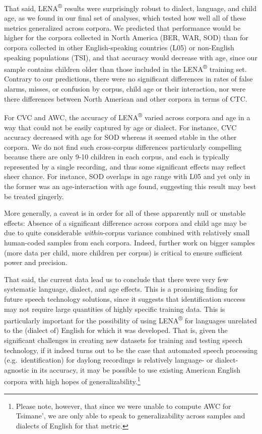 \documentclass[english,table,man,floatsintext]{apa6}
\begin{document}
That said, LENA\textsuperscript{®} results were surprisingly robust to dialect, language, and child age, as we found in our final set of analyses, which tested how well all of these metrics generalized across corpora. We predicted that performance would be higher for the corpora collected in North America (BER, WAR, SOD) than for corpora collected in other English-speaking countries (L05) or non-English speaking populations (TSI), and that accuracy would decrease with age, since our sample contains children older than those included in the LENA\textsuperscript{®} training set. Contrary to our predictions, there were no significant differences in rates of false alarms, misses, or confusion by corpus, child age or their interaction, nor were there differences between North American and other corpora in terms of CTC.

For CVC and AWC, the accuracy of LENA\textsuperscript{®} varied across corpora and age in a way that could not be easily captured by age or dialect. For instance, CVC accuracy decreased with age for SOD whereas it seemed stable in the other corpora. We do not find such cross-corpus differences particularly compelling because there are only 9-10 children in each corpus, and each is typically represented by a single recording, and thus some significant effects may reflect sheer chance. For instance, SOD overlaps in age range with L05 and yet only in the former was an age-interaction with age found, suggesting this result may best be treated gingerly.

More generally, a caveat is in order for all of these apparently null or unstable effects: Absence of a significant difference across corpora and child age may be due to quite considerable \emph{within}-corpus variance combined with relatively small human-coded samples from each corpora. Indeed, further work on bigger samples (more data per child, more children per corpus) is critical to ensure sufficient power and precision.

That said, the current data lead us to conclude that there were very few systematic language, dialect, and age effects. This is a promising finding for future speech technology solutions, since it suggests that identification success may not require large quantities of highly specific training data. This is particularly important for the possibility of using LENA\textsuperscript{®} for languages unrelated to the (dialect of) English for which it was developed. That is, given the significant challenges in creating new datasets for training and testing speech technology, if it indeed turns out to be the case that automated speech processing (e.g.~identification) for daylong recordings is relatively language- or dialect-agnostic in its accuracy, it may be possible to use existing American English corpora with high hopes of generalizability.\footnote{Please note, however, that since we were unable to compute AWC for Tsimane', we are only able to speak to generalizability across samples and dialects of English for that metric.}
\end{document}
